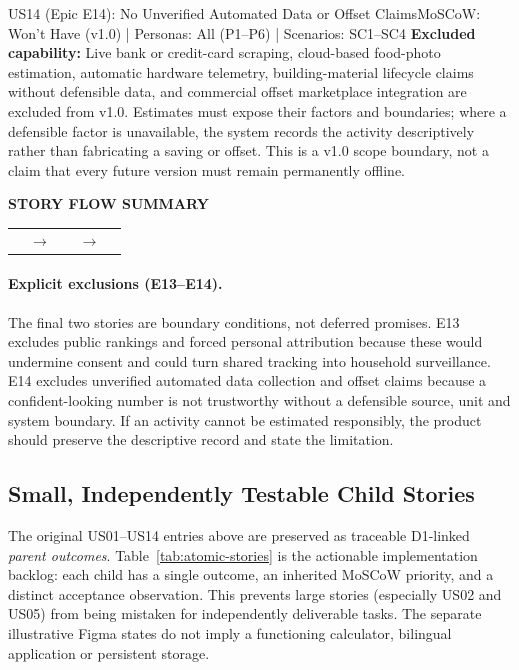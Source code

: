 \documentclass[12pt,a4paper]{article}
\makeatletter
\renewcommand{\arraystretch}{1.38}
\newcommand{\storyflow}[3]{%
  \par\Needspace{5\baselineskip}\vspace{0.08cm}%
  \begin{tcolorbox}[
    enhanced,width=\linewidth,
    colback=RowGray!72,colframe=RuleGray,
    boxrule=0.5pt,arc=1.2mm,
    borderline west={2pt}{0pt}{Teal},
    left=9pt,right=9pt,top=9pt,bottom=9pt,
    before skip=0pt,after skip=0pt
  ]
    {\sffamily\footnotesize\bfseries\color{Teal}STORY FLOW SUMMARY}\par
    \vspace{0.18cm}
    \renewcommand{\arraystretch}{1.0}%
    \begin{tabularx}{\linewidth}{@{}>{\centering\arraybackslash}X
      >{\centering\arraybackslash}p{0.52cm}
      >{\centering\arraybackslash}X
      >{\centering\arraybackslash}p{0.52cm}
      >{\centering\arraybackslash}X@{}}
      \fcolorbox{Teal!42}{white}{%
        \parbox[c][1.65cm][c]{\dimexpr\hsize-2\fboxsep-2\fboxrule\relax}{%
          \centering\sffamily\small\bfseries\color{Teal}01\par
          \vspace{3pt}\normalfont\small\color{Navy}#1}} &
      {\color{Teal}\normalsize$\to$} &
      \fcolorbox{Teal!42}{white}{%
        \parbox[c][1.65cm][c]{\dimexpr\hsize-2\fboxsep-2\fboxrule\relax}{%
          \centering\sffamily\small\bfseries\color{Teal}02\par
          \vspace{3pt}\normalfont\small\color{Navy}#2}} &
      {\color{Teal}\normalsize$\to$} &
      \fcolorbox{Teal!42}{white}{%
        \parbox[c][1.65cm][c]{\dimexpr\hsize-2\fboxsep-2\fboxrule\relax}{%
          \centering\sffamily\small\bfseries\color{Teal}03\par
          \vspace{3pt}\normalfont\small\color{Navy}#3}}
    \end{tabularx}
  \end{tcolorbox}
  \vspace{0.08cm}%
}
\makeatother
\begin{document}
\vspace{0.28cm}

\Needspace{0.30\textheight}
\begin{storybox}{US14 (Epic E14): No Unverified Automated Data or Offset Claims}{MoSCoW: Won't Have (v1.0) | Personas: All (P1--P6) | Scenarios: SC1--SC4}
\textbf{Excluded capability:} Live bank or credit-card scraping, cloud-based food-photo estimation, automatic hardware telemetry, building-material lifecycle claims without defensible data, and commercial offset marketplace integration are excluded from v1.0. Estimates must expose their factors and boundaries; where a defensible factor is unavailable, the system records the activity descriptively rather than fabricating a saving or offset. This is a v1.0 scope boundary, not a claim that every future version must remain permanently offline.
\end{storybox}
\storyflow{No public rankings or forced attribution}{No unverified automated data}{No unsupported offset claims}

\paragraph{Explicit exclusions (E13--E14).}
The final two stories are boundary conditions, not deferred promises. E13 excludes public rankings and forced personal attribution because these would undermine consent and could turn shared tracking into household surveillance. E14 excludes unverified automated data collection and offset claims because a confident-looking number is not trustworthy without a defensible source, unit and system boundary. If an activity cannot be estimated responsibly, the product should preserve the descriptive record and state the limitation.




\subsection{Small, Independently Testable Child Stories}
The original US01--US14 entries above are preserved as traceable D1-linked \emph{parent outcomes}. Table~\ref{tab:atomic-stories} is the actionable implementation backlog: each child has a single outcome, an inherited MoSCoW priority, and a distinct acceptance observation. This prevents large stories (especially US02 and US05) from being mistaken for independently deliverable tasks. The separate illustrative Figma states do not imply a functioning calculator, bilingual application or persistent storage.
\end{document}
